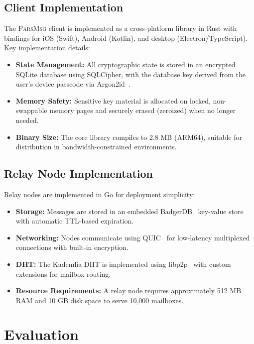 \documentclass[11pt,a4paper]{article}
\newcommand{\protname}{\textsc{ParsMsg}\xspace}
\begin{document}
\subsection{Client Implementation}

The \protname client is implemented as a cross-platform library in Rust with bindings for iOS (Swift), Android (Kotlin), and desktop (Electron/TypeScript). Key implementation details:

\begin{itemize}
    \item \textbf{State Management:} All cryptographic state is stored in an encrypted SQLite database using SQLCipher, with the database key derived from the user's device passcode via Argon2id~\citep{biryukov2016argon2}.
    \item \textbf{Memory Safety:} Sensitive key material is allocated on locked, non-swappable memory pages and securely erased (zeroized) when no longer needed.
    \item \textbf{Binary Size:} The core library compiles to 2.8 MB (ARM64), suitable for distribution in bandwidth-constrained environments.
\end{itemize}

\subsection{Relay Node Implementation}

Relay nodes are implemented in Go for deployment simplicity:

\begin{itemize}
    \item \textbf{Storage:} Messages are stored in an embedded BadgerDB~\citep{badgerdb} key-value store with automatic TTL-based expiration.
    \item \textbf{Networking:} Nodes communicate using QUIC~\citep{langley2017quic} for low-latency multiplexed connections with built-in encryption.
    \item \textbf{DHT:} The Kademlia DHT is implemented using libp2p~\citep{dias2022libp2p} with custom extensions for mailbox routing.
    \item \textbf{Resource Requirements:} A relay node requires approximately 512 MB RAM and 10 GB disk space to serve 10{,}000 mailboxes.
\end{itemize}

\section{Evaluation}
\end{document}
